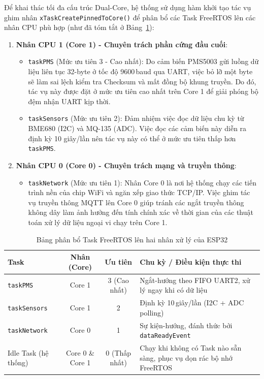 \documentclass[12pt,a4paper]{article}
\begin{document}
Để khai thác tối đa cấu trúc Dual-Core, hệ thống sử dụng hàm khởi tạo tác vụ ghim nhân \texttt{xTaskCreatePinnedToCore()} để phân bổ các Task FreeRTOS lên các nhân CPU phù hợp (như đã tóm tắt ở Bảng~\ref{tab:freertos_gw}):
\begin{enumerate}
    \item \textbf{Nhân CPU 1 (Core 1) - Chuyên trách phần cứng đầu cuối}:
    \begin{itemize}
        \item \texttt{taskPMS} (Mức ưu tiên 3 - Cao nhất): Do cảm biến PMS5003 gửi luồng dữ liệu liên tục 32-byte ở tốc độ 9600\,baud qua UART, việc bỏ lỡ một byte sẽ làm sai lệch kiểm tra Checksum và mất đồng bộ khung truyền. Do đó, tác vụ này được đặt ở mức ưu tiên cao nhất trên Core 1 để giải phóng bộ đệm nhận UART kịp thời.
        \item \texttt{taskSensors} (Mức ưu tiên 2): Đảm nhiệm việc đọc dữ liệu chu kỳ từ BME680 (I2C) và MQ-135 (ADC). Việc đọc các cảm biến này diễn ra định kỳ 10 giây/lần nên tác vụ này có thể ở mức ưu tiên thấp hơn \texttt{taskPMS}.
    \end{itemize}
    \item \textbf{Nhân CPU 0 (Core 0) - Chuyên trách mạng và truyền thông}:
    \begin{itemize}
        \item \texttt{taskNetwork} (Mức ưu tiên 1): Nhân Core 0 là nơi hệ thống chạy các tiến trình nền của chip WiFi và ngăn xếp giao thức TCP/IP. Việc ghim tác vụ truyền thông MQTT lên Core 0 giúp tránh các ngắt truyền thông không dây làm ảnh hưởng đến tính chính xác về thời gian của các thuật toán xử lý dữ liệu ngoại vi chạy trên Core 1.
    \end{itemize}
\end{enumerate}

\begin{table}[H]
\centering\small
\caption{Bảng phân bổ Task FreeRTOS lên hai nhân xử lý của ESP32}
\label{tab:freertos_gw}
\begin{tabular}{|l|c|c|>{\raggedright\arraybackslash}p{5.2cm}|}
\hline
\textbf{Task} & \textbf{Nhân (Core)} & \textbf{Ưu tiên} & \textbf{Chu kỳ / Điều kiện thực thi} \\ 
        \hline
\texttt{taskPMS} & Core 1 & 3 (Cao nhất) & Ngắt-hướng theo FIFO UART2, xử lý ngay khi có dữ liệu \\ 
        \hline
\texttt{taskSensors} & Core 1 & 2 & Định kỳ 10\,giây/lần (I2C + ADC polling) \\ 
        \hline
\texttt{taskNetwork} & Core 0 & 1 & Sự kiện-hướng, đánh thức bởi \texttt{dataReadyEvent} \\ 
        \hline
Idle Task (hệ thống) & Core 0 \& Core 1 & 0 (Thấp nhất) & Chạy khi không có Task nào sẵn sàng, phục vụ dọn rác bộ nhớ FreeRTOS \\ 
        \hline\end{tabular}
\end{table}
\end{document}
